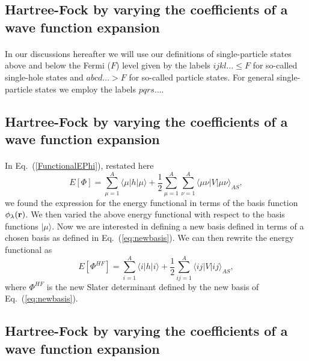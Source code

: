 \documentclass[%
twoside,                 %
final,                   %
10pt]{article}
\begin{document}
\subsection*{Hartree-Fock by varying the coefficients of a wave function expansion}

\paragraph{}
In our discussions hereafter we will use our definitions of single-particle states above and below the Fermi ($F$) level given by the labels
$ijkl\dots \le F$ for so-called single-hole states and $abcd\dots > F$ for so-called particle states.
For general single-particle states we employ the labels $pqrs\dots$.




\subsection*{Hartree-Fock by varying the coefficients of a wave function expansion}

\paragraph{}
In Eq.~(\ref{FunctionalEPhi}), restated here
\[
  E[\Phi] 
  = \sum_{\mu=1}^A \langle \mu | h | \mu \rangle +
  \frac{1}{2}\sum_{{\mu}=1}^A\sum_{{\nu}=1}^A \langle \mu\nu|V|\mu\nu\rangle_{AS},
\]
we found the expression for the energy functional in terms of the basis function $\phi_{\lambda}({\bf r})$. We then  varied the above energy functional with respect to the basis functions $|\mu \rangle$. 
Now we are interested in defining a new basis defined in terms of
a chosen basis as defined in Eq.~(\ref{eq:newbasis}). We can then rewrite the energy functional as
\begin{equation}
  E[\Phi^{HF}] 
  = \sum_{i=1}^A \langle i | h | i \rangle +
  \frac{1}{2}\sum_{ij=1}^A\langle ij|V|ij\rangle_{AS}, \label{FunctionalEPhi2}
\end{equation}
where $\Phi^{HF}$ is the new Slater determinant defined by the new basis of Eq.~(\ref{eq:newbasis}).



\subsection*{Hartree-Fock by varying the coefficients of a wave function expansion}
\end{document}
